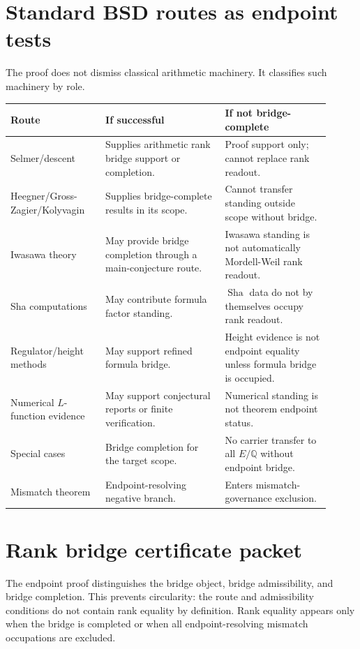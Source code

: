 \documentclass[11pt]{article}
\newcommand{\Q}{\mathbb{Q}}
\newcommand{\Sha}{\operatorname{Sha}}
\begin{document}
\section{Standard BSD routes as endpoint tests}

The proof does not dismiss classical arithmetic machinery. It classifies such machinery by role.

\begin{longtable}{L{0.27\linewidth}L{0.34\linewidth}L{0.30\linewidth}}
\toprule
\textbf{Route} & \textbf{If successful} & \textbf{If not bridge-complete}\\
\midrule
Selmer/descent & Supplies arithmetic rank bridge support or completion. & Proof support only; cannot replace rank readout.\\
Heegner/Gross-Zagier/Kolyvagin & Supplies bridge-complete results in its scope. & Cannot transfer standing outside scope without bridge.\\
Iwasawa theory & May provide bridge completion through a main-conjecture route. & Iwasawa standing is not automatically Mordell-Weil rank readout.\\
Sha computations & May contribute formula factor standing. & $\Sha$ data do not by themselves occupy rank readout.\\
Regulator/height methods & May support refined formula bridge. & Height evidence is not endpoint equality unless formula bridge is occupied.\\
Numerical $L$-function evidence & May support conjectural reports or finite verification. & Numerical standing is not theorem endpoint status.\\
Special cases & Bridge completion for the target scope. & No carrier transfer to all $E/\Q$ without endpoint bridge.\\
Mismatch theorem & Endpoint-resolving negative branch. & Enters mismatch-governance exclusion.\\
\bottomrule
\end{longtable}



\section{Rank bridge certificate packet}

The endpoint proof distinguishes the bridge object, bridge admissibility, and bridge completion. This prevents circularity: the route and admissibility conditions do not contain rank equality by definition. Rank equality appears only when the bridge is completed or when all endpoint-resolving mismatch occupations are excluded.
\end{document}
